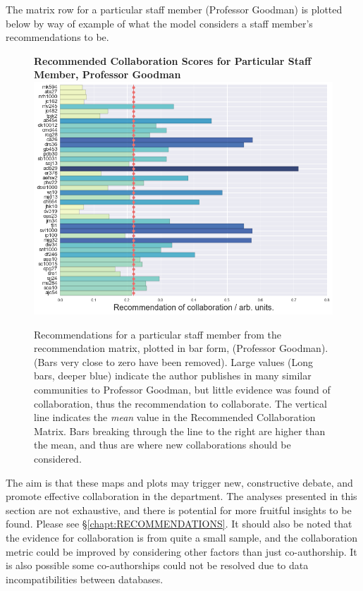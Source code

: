 The matrix row for a particular staff member (Professor Goodman) is plotted below by way of example of what the model considers a staff member's recommendations to be.
\begin{center}
\begin{figure}[H]
  \centering
  \textbf{Recommended Collaboration Scores for Particular Staff Member, Professor Goodman}
    \includegraphics[width=\textwidth]{Analysis/jmg_dots_line.png}
    \caption[Recommended Collaboration Scores for Particular Staff Member]{Recommendations for a particular staff member from the recommendation matrix, plotted in bar form, (Professor Goodman). (Bars very close to zero have been removed). Large values (Long bars, deeper blue) indicate the author publishes in many similar communities to Professor Goodman, but little evidence was found of collaboration, thus the recommendation to collaborate. The vertical line indicates the \emph{mean} value in the Recommended Collaboration Matrix. Bars breaking through the line to the right are higher than the mean, and thus are where new collaborations should be considered.}
    \label{fig:RECOMM_BAR}
\end{figure} 
\end{center}
The aim is that these maps and plots may trigger new, constructive debate, and promote effective collaboration in the department. The analyses presented in this section are not exhaustive, and there is potential for more fruitful insights to be found. Please see \S\ref{chapt:RECOMMENDATIONS}. It should also be noted that the evidence for collaboration is from quite a small sample, and the collaboration metric could be improved by considering other factors than just co-authorship. It is also possible some co-authorships could not be resolved due to data incompatibilities between databases.

